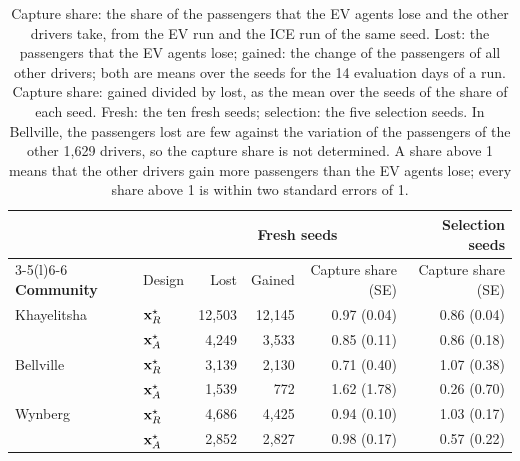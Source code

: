 \begin{table}[htbp]
    \centering
    \footnotesize
    \caption[Capture share of the passengers that the EV agents lose]{Capture share: the share of the passengers that the EV agents lose and the other drivers take, from the EV run and the ICE run of the same seed. Lost: the passengers that the EV agents lose; gained: the change of the passengers of all other drivers; both are means over the seeds for the 14 evaluation days of a run. Capture share: gained divided by lost, as the mean over the seeds of the share of each seed. Fresh: the ten fresh seeds; selection: the five selection seeds. In Bellville, the passengers lost are few against the variation of the passengers of the other 1,629 drivers, so the capture share is not determined. A share above 1 means that the other drivers gain more passengers than the EV agents lose; every share above 1 is within two standard errors of 1.}
    \label{tab:ice_capture}
    \begin{tabularx}{\linewidth}{@{}Xlrrrr@{}}
        \toprule
        & & \multicolumn{3}{c}{Fresh seeds} & Selection seeds \\
        \cmidrule(lr){3-5}\cmidrule(l){6-6}
        \textbf{Community} & Design & Lost & Gained & Capture share (SE) & Capture share (SE) \\
        \midrule
        Khayelitsha & $\mathbf{x}_R^{\star}$ & 12,503 & 12,145 & 0.97 (0.04) & 0.86 (0.04) \\
                    & $\mathbf{x}_A^{\star}$ & 4,249 & 3,533 & 0.85 (0.11) & 0.86 (0.18) \\
        \addlinespace
        Bellville   & $\mathbf{x}_R^{\star}$ & 3,139 & 2,130 & 0.71 (0.40) & 1.07 (0.38) \\
                    & $\mathbf{x}_A^{\star}$ & 1,539 & 772 & 1.62 (1.78) & 0.26 (0.70) \\
        \addlinespace
        Wynberg     & $\mathbf{x}_R^{\star}$ & 4,686 & 4,425 & 0.94 (0.10) & 1.03 (0.17) \\
                    & $\mathbf{x}_A^{\star}$ & 2,852 & 2,827 & 0.98 (0.17) & 0.57 (0.22) \\
        \bottomrule
    \end{tabularx}
\end{table}

